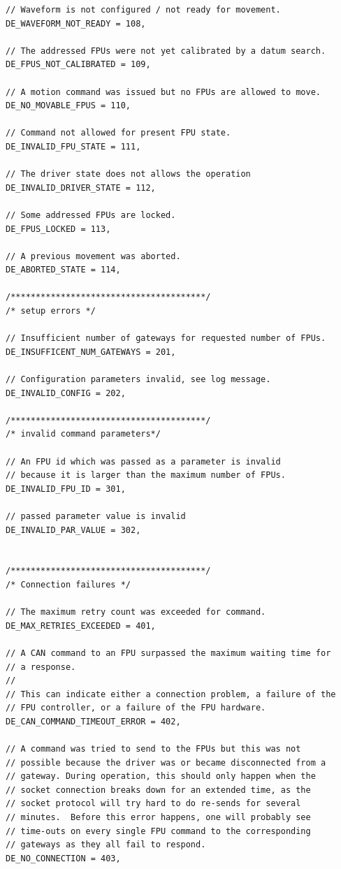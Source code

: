 \documentclass[11pt,a4paper]{report}
\begin{document}
\begin{verbatim}
// Waveform is not configured / not ready for movement.
DE_WAVEFORM_NOT_READY = 108,

// The addressed FPUs were not yet calibrated by a datum search.
DE_FPUS_NOT_CALIBRATED = 109,

// A motion command was issued but no FPUs are allowed to move.
DE_NO_MOVABLE_FPUS = 110,

// Command not allowed for present FPU state.
DE_INVALID_FPU_STATE = 111,

// The driver state does not allows the operation
DE_INVALID_DRIVER_STATE = 112,

// Some addressed FPUs are locked.
DE_FPUS_LOCKED = 113,

// A previous movement was aborted.
DE_ABORTED_STATE = 114,

/***************************************/
/* setup errors */

// Insufficient number of gateways for requested number of FPUs.
DE_INSUFFICENT_NUM_GATEWAYS = 201,

// Configuration parameters invalid, see log message.
DE_INVALID_CONFIG = 202,

/***************************************/
/* invalid command parameters*/

// An FPU id which was passed as a parameter is invalid
// because it is larger than the maximum number of FPUs.
DE_INVALID_FPU_ID = 301,

// passed parameter value is invalid
DE_INVALID_PAR_VALUE = 302,


/***************************************/
/* Connection failures */

// The maximum retry count was exceeded for command.
DE_MAX_RETRIES_EXCEEDED = 401,

// A CAN command to an FPU surpassed the maximum waiting time for
// a response.
//
// This can indicate either a connection problem, a failure of the
// FPU controller, or a failure of the FPU hardware.
DE_CAN_COMMAND_TIMEOUT_ERROR = 402,

// A command was tried to send to the FPUs but this was not
// possible because the driver was or became disconnected from a
// gateway. During operation, this should only happen when the
// socket connection breaks down for an extended time, as the
// socket protocol will try hard to do re-sends for several
// minutes.  Before this error happens, one will probably see
// time-outs on every single FPU command to the corresponding
// gateways as they all fail to respond.
DE_NO_CONNECTION = 403,



\end{verbatim}
\end{document}
